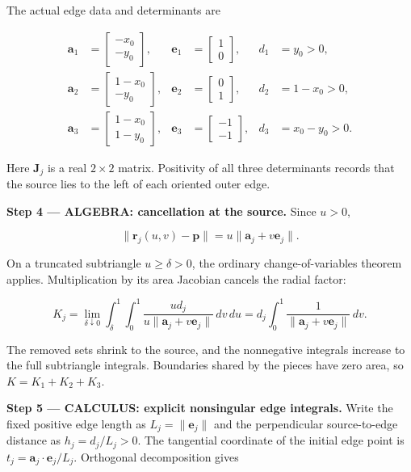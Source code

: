 \documentclass[11pt,oneside,openany]{book}
\begin{document}
The actual edge data and determinants are

\[
\begin{aligned}
\mathbf a_1&=\begin{bmatrix}-x_0\\-y_0\end{bmatrix},&
\mathbf e_1&=\begin{bmatrix}1\\0\end{bmatrix},&d_1&=y_0>0,\\
\mathbf a_2&=\begin{bmatrix}1-x_0\\-y_0\end{bmatrix},&
\mathbf e_2&=\begin{bmatrix}0\\1\end{bmatrix},&d_2&=1-x_0>0,\\
\mathbf a_3&=\begin{bmatrix}1-x_0\\1-y_0\end{bmatrix},&
\mathbf e_3&=\begin{bmatrix}-1\\-1\end{bmatrix},&d_3&=x_0-y_0>0.
\end{aligned}
\]

Here \(\mathbf J_j\) is a real \(2\times2\) matrix. Positivity of all three determinants records that the source lies to the left of each oriented outer edge.

\begingroup\color{AlgebraBlue}
\textbf{Step 4 --- ALGEBRA: cancellation at the source.} Since \(u>0\),

\[
\|\mathbf r_j(u,v)-\mathbf p\|=u\|\mathbf a_j+v\mathbf e_j\|.
\]

On a truncated subtriangle \(u\ge\delta>0\), the ordinary change-of-variables theorem applies. Multiplication by its area Jacobian cancels the radial factor:

\[
K_j=\lim_{\delta\downarrow0}\int_\delta^1\int_0^1
\frac{ud_j}{u\|\mathbf a_j+v\mathbf e_j\|}\,dv\,du
=d_j\int_0^1\frac1{\|\mathbf a_j+v\mathbf e_j\|}\,dv.
\]

The removed sets shrink to the source, and the nonnegative integrals increase to the full subtriangle integrals. Boundaries shared by the pieces have zero area, so \(K=K_1+K_2+K_3\).

\endgroup
\textbf{Step 5 --- CALCULUS: explicit nonsingular edge integrals.} Write the fixed positive edge length as \(L_j=\|\mathbf e_j\|\) and the perpendicular source-to-edge distance as \(h_j=d_j/L_j>0\). The tangential coordinate of the initial edge point is \(t_j=\mathbf a_j\cdot\mathbf e_j/L_j\). Orthogonal decomposition gives
\end{document}
